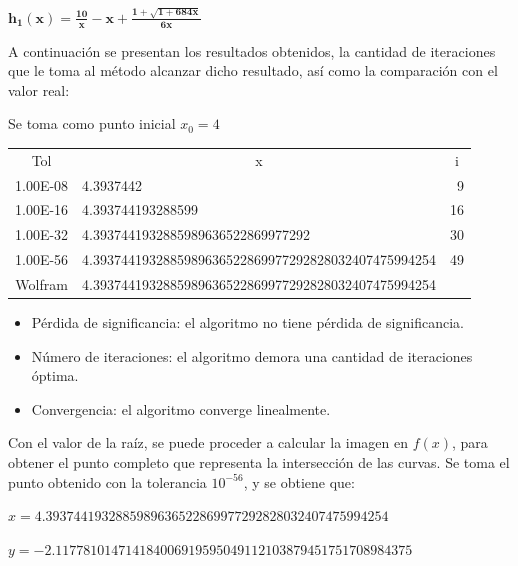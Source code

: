 \documentclass[a4paper,12pt]{article}
\begin{document}
\newpage 

$\mathbf{h_1(x)=\frac{10}{x}-x +\frac{1 + \sqrt{1 + 684 x}}{6x}}$ \par

\vspace{1em}

A continuación se presentan los resultados obtenidos, la cantidad de iteraciones que le toma al método alcanzar dicho resultado, así como la comparación con el valor real: \par

Se toma como punto inicial $x_0=4$ \par

\begin{table}[ht!]
\begin{tabular}{clr}
Tol      & \multicolumn{1}{c}{x}                               & \multicolumn{1}{c}{i} \\
1.00E-08 & 4.3937442                                           & 9                     \\
1.00E-16 & 4.393744193288599                                   & 16                    \\
1.00E-32 & 4.3937441932885989636522869977292                   & 30                    \\
1.00E-56 & 4.3937441932885989636522869977292828032407475994254 & 49                    \\
Wolfram  & 4.3937441932885989636522869977292828032407475994254 &                      
\end{tabular}
\end{table}

\vspace{-1em}
\begin{itemize}
    \item Pérdida de significancia: el algoritmo no tiene pérdida de significancia.
    \vspace{-10pt}
    \item Número de iteraciones: el algoritmo demora una cantidad de iteraciones óptima.
    \vspace{-10pt}
    \item Convergencia: el algoritmo converge linealmente.
\end{itemize}

Con el valor de la raíz, se puede proceder a calcular la imagen en $f(x)$, para obtener el punto completo que representa la intersección de las curvas. Se toma el punto obtenido con la tolerancia $10^{-56}$, y se obtiene que: \par
$x= 4.3937441932885989636522869977292828032407475994254$ \par 
$y=-2.117781014714184006919595049112103879451751708984375$ \par 
\end{document}
